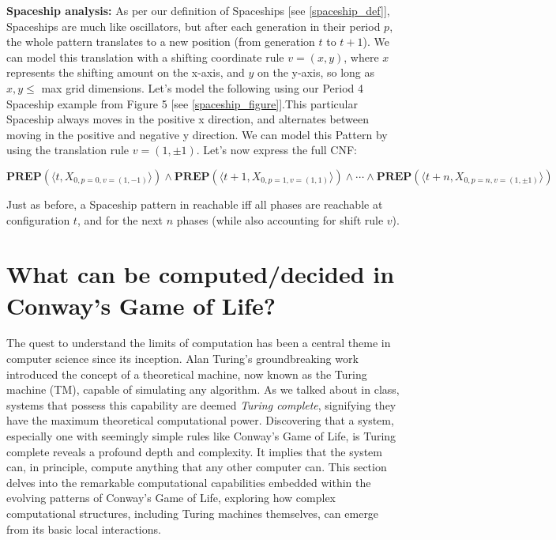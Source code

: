 \documentclass{article}
\theoremstyle{definition}
\theoremstyle{plain}
\theoremstyle{plain}
\begin{document}
\textbf{Spaceship analysis:}
As per our definition of Spaceships [see \ref{spaceship_def}], Spaceships are much like oscillators, but after each generation in their period $p$, the whole pattern translates to a new position (from generation $t$ to $t+1$). We can model this translation with a shifting coordinate rule $v = (x,y)$, where $x$ represents the shifting amount on the x-axis, and $y$ on the y-axis, so long as $x,y \leq$ max grid dimensions. Let's model the following using our Period 4 Spaceship example from Figure 5 [see \ref{spaceship_figure}].This particular Spaceship always moves in the positive x direction, and alternates between moving in the positive and negative y direction. We can model this Pattern by using the translation rule $v = (1,\pm1)$. Let's now express the full CNF:


\begin{equation}
  \textbf{PREP}(\langle t, X_{0,p=0,v=(1,-1)} \rangle) \land \textbf{PREP}(\langle t+1, X_{0,p=1,v=(1,1)} \rangle) \land \cdots \land \textbf{PREP}(\langle t+n, X_{0,p=n,v=(1,\pm1)} \rangle)
\end{equation}

Just as before, a Spaceship pattern in reachable iff all phases are reachable at configuration $t$, and for the next $n$ phases (while also accounting for shift rule $v$).

\section{What can be computed/decided in Conway’s Game of Life?}

The quest to understand the limits of computation has been a central theme in computer science since its inception. Alan Turing's groundbreaking work introduced the concept of a theoretical machine, now known as the Turing machine (TM), capable of simulating any algorithm. As we talked about in class, systems that possess this capability are deemed \textit{Turing complete}, signifying they have the maximum theoretical computational power. Discovering that a system, especially one with seemingly simple rules like Conway's Game of Life, is Turing complete reveals a profound depth and complexity. It implies that the system can, in principle, compute anything that any other computer can. This section delves into the remarkable computational capabilities embedded within the evolving patterns of Conway's Game of Life, exploring how complex computational structures, including Turing machines themselves, can emerge from its basic local interactions.
\end{document}
